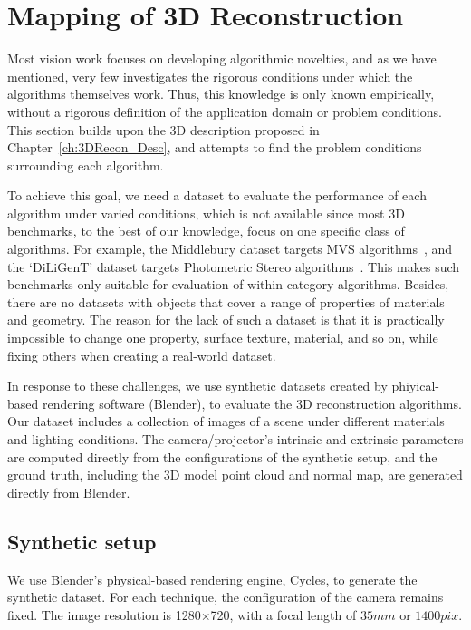 
\chapter{Mapping of 3D Reconstruction}
\label{ch:3DRecon_Mapping}
Most vision work focuses on developing algorithmic novelties, and as we have mentioned, very few investigates the rigorous conditions under which the algorithms themselves work. Thus, this knowledge is only known empirically, without a rigorous definition of the application domain or problem conditions. This section builds upon the 3D description proposed in Chapter~\ref{ch:3DRecon_Desc}, and attempts to find the problem conditions surrounding each algorithm.

To achieve this goal, we need a dataset to evaluate the performance of each algorithm under varied conditions, which is not available since most 3D benchmarks, to the best of our knowledge, focus on one specific class of algorithms. For example, the Middlebury dataset targets MVS algorithms~\cite{seitz2006comparison}, and the `DiLiGenT' dataset targets Photometric Stereo algorithms~\cite{shi2016benchmark}. This makes such benchmarks only suitable for evaluation of within-category algorithms. Besides, there are no datasets with objects that cover a range of properties of materials and geometry. The reason for the lack of such a dataset is that it is practically impossible to change one property, \eg surface texture, material, and so on, while fixing others when creating a real-world dataset.

In response to these challenges, we use synthetic datasets created by phiyical-based rendering software (Blender), to evaluate the 3D reconstruction algorithms. Our dataset includes a collection of images of a scene under different materials and lighting conditions. The camera/projector's intrinsic and extrinsic parameters are computed directly from the configurations of the synthetic setup, and the ground truth, including the 3D model point cloud and normal map, are generated directly from Blender.

\section{Synthetic setup}
We use Blender's physical-based rendering engine, Cycles, to generate the synthetic dataset. For each technique, the configuration of the camera remains fixed. The image resolution is 1280$\times$720, with a focal length of $35mm$ or $1400pix$.

